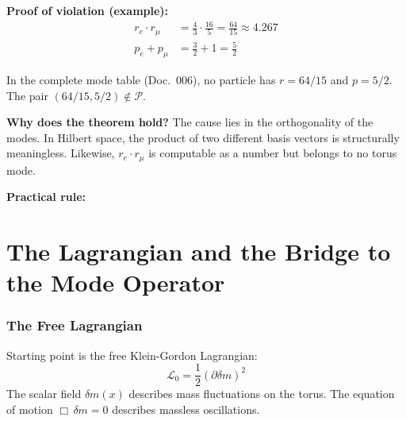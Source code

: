\textbf{Proof of violation (example):}
\begin{align*}
  r_e \cdot r_\mu &= \frac{4}{3} \cdot \frac{16}{5} = \frac{64}{15}
  \approx 4.267 \\
  p_e + p_\mu &= \frac{3}{2} + 1 = \frac{5}{2}
\end{align*}

In the complete mode table (Doc.~006), no particle has $r = 64/15$
and $p = 5/2$. The pair $(64/15, 5/2) \notin \mathcal{P}$.

\textbf{Why does the theorem hold?} The cause lies in the orthogonality
of the modes. In Hilbert space, the product of two different basis
vectors is structurally meaningless. Likewise, $r_e \cdot r_\mu$ is
computable as a number but belongs to no torus mode.

\textbf{Practical rule:}

\begin{center}
{\footnotesize
{}
}
\end{center}

\part{The Lagrangian and the Bridge to the Mode Operator}

\section{The Free Lagrangian}

Starting point is the free Klein-Gordon Lagrangian:
\begin{equation}
  \mathcal{L}_0 = \frac{1}{2}(\partial\delta m)^2
\end{equation}
The scalar field $\delta m(x)$ describes mass fluctuations on the torus.
The equation of motion $\Box\,\delta m = 0$ describes massless oscillations.

